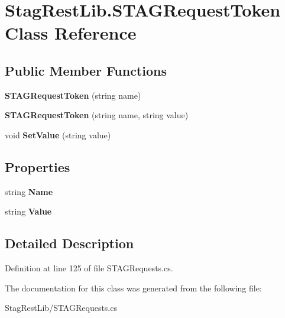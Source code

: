 \hypertarget{class_stag_rest_lib_1_1_s_t_a_g_request_token}{}\section{Stag\+Rest\+Lib.\+S\+T\+A\+G\+Request\+Token Class Reference}
\label{class_stag_rest_lib_1_1_s_t_a_g_request_token}
\subsection*{Public Member Functions}
\begin{DoxyCompactItemize}
\item 
\mbox{\label{class_stag_rest_lib_1_1_s_t_a_g_request_token_a47e5692ed14dc4615124c417835bca12}} 
{\bfseries S\+T\+A\+G\+Request\+Token} (string name)
\item 
\mbox{\label{class_stag_rest_lib_1_1_s_t_a_g_request_token_a22cf86bd6d1ea6afce4b8eb28e79ad86}} 
{\bfseries S\+T\+A\+G\+Request\+Token} (string name, string value)
\item 
\mbox{\label{class_stag_rest_lib_1_1_s_t_a_g_request_token_afa46fb12962cec389d91d824f795fbb8}} 
void {\bfseries Set\+Value} (string value)
\end{DoxyCompactItemize}
\subsection*{Properties}
\begin{DoxyCompactItemize}
\item 
\mbox{\label{class_stag_rest_lib_1_1_s_t_a_g_request_token_a5a36a3d994c9ab6dd29198dfbffe52dd}} 
string {\bfseries Name}
\item 
\mbox{\label{class_stag_rest_lib_1_1_s_t_a_g_request_token_a6d33a11fb0b7d93a1ca11b831eb275e8}} 
string {\bfseries Value}
\end{DoxyCompactItemize}


\subsection{Detailed Description}


Definition at line 125 of file S\+T\+A\+G\+Requests.\+cs.



The documentation for this class was generated from the following file\+:\begin{DoxyCompactItemize}
\item 
Stag\+Rest\+Lib/S\+T\+A\+G\+Requests.\+cs\end{DoxyCompactItemize}

